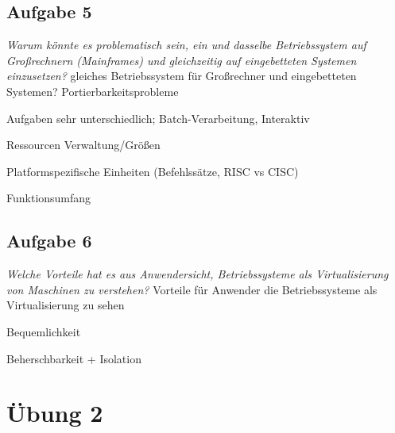 \documentclass[a4paper]{article}
\begin{document}
\subsection{Aufgabe 5}
\textit{Warum könnte es problematisch sein, ein und dasselbe Betriebssystem auf Großrechnern (Mainframes) und gleichzeitig auf eingebetteten Systemen einzusetzen?}
\vspace{10mm}
gleiches Betriebssystem für Großrechner und eingebetteten Systemen? Portierbarkeitsprobleme
\begin{itemize*}
    \item Aufgaben sehr unterschiedlich; Batch-Verarbeitung, Interaktiv
    \item Ressourcen Verwaltung/Größen
    \item Platformspezifische Einheiten (Befehlssätze, RISC vs CISC)
    \item Funktionsumfang
\end{itemize*}

\subsection{Aufgabe 6}
\textit{Welche Vorteile hat es aus Anwendersicht, Betriebssysteme als Virtualisierung von Maschinen zu verstehen?}
\vspace{10mm}
Vorteile für Anwender die Betriebssysteme als Virtualisierung zu sehen
\begin{itemize*}
    \item Bequemlichkeit
    \item Beherschbarkeit + Isolation
\end{itemize*}

\newpage
\section{Übung 2}
\end{document}
